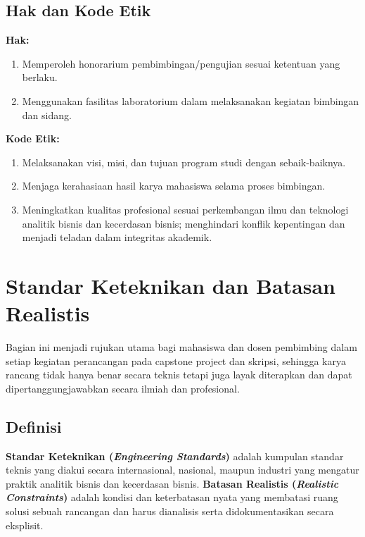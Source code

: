 \documentclass[12pt,a4paper]{report}
\begin{document}
\section{Hak dan Kode Etik}
\textbf{Hak:}
\begin{enumerate}
\item Memperoleh honorarium pembimbingan/pengujian sesuai ketentuan yang berlaku.
\item Menggunakan fasilitas laboratorium dalam melaksanakan kegiatan bimbingan dan sidang.
\end{enumerate}
\textbf{Kode Etik:}
\begin{enumerate}
\item Melaksanakan visi, misi, dan tujuan program studi dengan sebaik-baiknya.
\item Menjaga kerahasiaan hasil karya mahasiswa selama proses bimbingan.
\item Meningkatkan kualitas profesional sesuai perkembangan ilmu dan teknologi analitik bisnis dan kecerdasan bisnis; menghindari konflik kepentingan dan menjadi teladan dalam integritas akademik.
\end{enumerate}

\chapter{Standar Keteknikan dan Batasan Realistis}
\label{chap:standar}

Bagian ini menjadi rujukan utama bagi mahasiswa dan dosen pembimbing dalam setiap kegiatan perancangan pada capstone project dan skripsi, sehingga karya rancang tidak hanya benar secara teknis tetapi juga layak diterapkan dan dapat dipertanggungjawabkan secara il\-mi\-ah dan pro\-fe\-sio\-nal.

\section{Definisi}
\textbf{Standar Keteknikan (\emph{Engineering Standards})} adalah kumpulan standar teknis yang diakui secara internasional, nasional, maupun industri yang mengatur praktik analitik bisnis dan kecerdasan bisnis. \textbf{Batasan Realistis (\emph{Realistic Constraints})} adalah kondisi dan keterbatasan nyata yang membatasi ruang solusi sebuah rancangan dan harus dianalisis serta didokumentasikan secara eksplisit.
\end{document}
